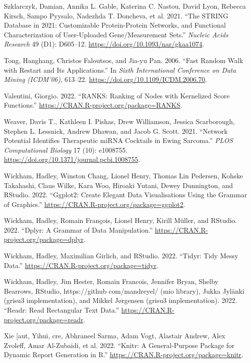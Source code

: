 \documentclass{article}
\newlength{\cslhangindent}
\newlength{\cslentryspacingunit} %
\newenvironment{CSLReferences}[2] %
 {%
  \setlength{\parindent}{0pt}
  \ifodd #1
  \let\oldpar\par
  \def\par{\hangindent=\cslhangindent\oldpar}
  \fi
  \setlength{\parskip}{#2\cslentryspacingunit}
 }%
 {}
\begin{document}
\begin{CSLReferences}{1}{0}
\leavevmode\hypertarget{ref-szklarczyk_string_2021}{}%
Szklarczyk, Damian, Annika L. Gable, Katerina C. Nastou, David Lyon,
Rebecca Kirsch, Sampo Pyysalo, Nadezhda T. Doncheva, et al. 2021. {``The
{STRING} Database in 2021: Customizable Protein-Protein Networks, and
Functional Characterization of User-Uploaded Gene/Measurement Sets.''}
\emph{Nucleic Acids Research} 49 (D1): D605--12.
\url{https://doi.org/10.1093/nar/gkaa1074}.

\leavevmode\hypertarget{ref-tong_fast_2006}{}%
Tong, Hanghang, Christos Faloutsos, and Jia-yu Pan. 2006. {``Fast
{Random} {Walk} with {Restart} and {Its} {Applications}.''} In
\emph{Sixth {International} {Conference} on {Data} {Mining}
({ICDM}'06)}, 613--22. \url{https://doi.org/10.1109/ICDM.2006.70}.

\leavevmode\hypertarget{ref-valentini_ranks_2022}{}%
Valentini, Giorgio. 2022. {``{RANKS}: {Ranking} of {Nodes} with
{Kernelized} {Score} {Functions}.''}
\url{https://CRAN.R-project.org/package=RANKS}.

\leavevmode\hypertarget{ref-weaver_network_2021}{}%
Weaver, Davis T., Kathleen I. Pishas, Drew Williamson, Jessica
Scarborough, Stephen L. Lessnick, Andrew Dhawan, and Jacob G. Scott.
2021. {``Network Potential Identifies Therapeutic {miRNA} Cocktails in
{Ewing} Sarcoma.''} \emph{PLOS Computational Biology} 17 (10): e1008755.
\url{https://doi.org/10.1371/journal.pcbi.1008755}.

\leavevmode\hypertarget{ref-wickham_ggplot2_2022}{}%
Wickham, Hadley, Winston Chang, Lionel Henry, Thomas Lin Pedersen,
Kohske Takahashi, Claus Wilke, Kara Woo, Hiroaki Yutani, Dewey
Dunnington, and RStudio. 2022. {``Ggplot2: {Create} {Elegant} {Data}
{Visualisations} {Using} the {Grammar} of {Graphics}.''}
\url{https://CRAN.R-project.org/package=ggplot2}.

\leavevmode\hypertarget{ref-wickham_dplyr_2022}{}%
Wickham, Hadley, Romain François, Lionel Henry, Kirill Müller, and
RStudio. 2022. {``Dplyr: {A} {Grammar} of {Data} {Manipulation}.''}
\url{https://CRAN.R-project.org/package=dplyr}.

\leavevmode\hypertarget{ref-wickham_tidyr_2022}{}%
Wickham, Hadley, Maximilian Girlich, and RStudio. 2022. {``Tidyr: {Tidy}
{Messy} {Data}.''} \url{https://CRAN.R-project.org/package=tidyr}.

\leavevmode\hypertarget{ref-wickham_readr_2022}{}%
Wickham, Hadley, Jim Hester, Romain Francois, Jennifer Bryan, Shelby
Bearrows, RStudio, https://github com/mandreyel/ (mio library), Jukka
Jylänki (grisu3 implementation), and Mikkel Jørgensen (grisu3
implementation). 2022. {``Readr: {Read} {Rectangular} {Text} {Data}.''}
\url{https://CRAN.R-project.org/package=readr}.

\leavevmode\hypertarget{ref-xie__aut_knitr_2022}{}%
Xie {[}aut, Yihui, cre, Abhraneel Sarma, Adam Vogt, Alastair Andrew,
Alex Zvoleff, Amar Al-Zubaidi, et al. 2022. {``Knitr: {A}
{General}-{Purpose} {Package} for {Dynamic} {Report} {Generation} in
{R}.''} \url{https://CRAN.R-project.org/package=knitr}.

\end{CSLReferences}



\end{document}
